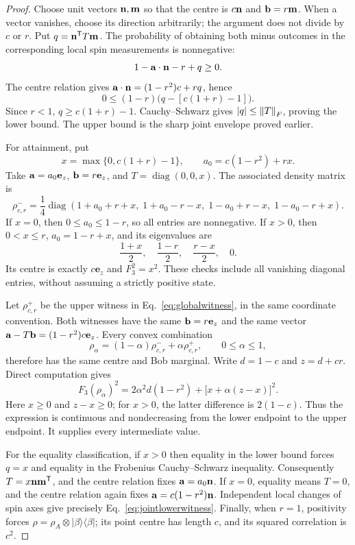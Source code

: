 \begin{proof}
Choose unit vectors $\nn,\mathbf m$ so that the centre is $c\nn$ and
$\bb=r\mathbf m$. When a vector vanishes, choose its direction arbitrarily;
the argument does not divide by $c$ or $r$. Put
$q=\nn^{\mathsf T}T\mathbf m$. The probability of obtaining both minus
outcomes in the corresponding local spin measurements is nonnegative:
\[
 1-\aa\cdot\nn-r+q\geq0.
\]
The centre relation gives
$\aa\cdot\nn=(1-r^2)c+rq$, hence
\begin{equation}\label{eq:lowerfactor}
0\leq(1-r)\bigl(q-[c(1+r)-1]\bigr).
\end{equation}
Since $r<1$, $q\geq c(1+r)-1$. Cauchy--Schwarz gives
$|q|\leq\norm T_F$, proving the lower bound. The upper bound is the sharp
joint envelope proved earlier.

For attainment, put
\[
x=\max\{0,c(1+r)-1\},\qquad a_0=c(1-r^2)+rx.
\]
Take $\aa=a_0\mathbf e_z$, $\bb=r\mathbf e_z$, and
$T=\operatorname{diag}(0,0,x)$. The associated density matrix is
\begin{equation}\label{eq:jointlowerwitness}
\rho^-_{c,r}=\frac14\operatorname{diag}
 (1+a_0+r+x,\;1+a_0-r-x,\;1-a_0+r-x,\;1-a_0-r+x).
\end{equation}
If $x=0$, then $0\leq a_0\leq1-r$, so all entries are nonnegative.
If $x>0$, then $0<x\leq r$, $a_0=1-r+x$, and its eigenvalues are
\[
\frac{1+x}{2},\quad\frac{1-r}{2},\quad\frac{r-x}{2},\quad0.
\]
Its centre is exactly $c\mathbf e_z$ and $F_3^2=x^2$.
These checks include all vanishing diagonal entries, without assuming a
strictly positive state.

Let $\rho^+_{c,r}$ be the upper witness in
Eq.~\eqref{eq:globalwitness}, in the same coordinate convention.
Both witnesses have the same $\bb=r\mathbf e_z$ and the same vector
$\aa-T\bb=(1-r^2)c\mathbf e_z$. Every convex combination
\[
\rho_\alpha=(1-\alpha)\rho^-_{c,r}+\alpha\rho^+_{c,r},
\qquad0\leq\alpha\leq1,
\]
therefore has the same centre and Bob marginal. Write $d=1-c$ and
$z=d+cr$. Direct computation gives
\begin{equation}\label{eq:jointinterpolate}
F_3(\rho_\alpha)^2=
2\alpha^2d(1-r^2)+\bigl[x+\alpha(z-x)\bigr]^2.
\end{equation}
Here $x\geq0$ and $z-x\geq0$; for $x>0$, the latter difference is
$2(1-c)$. Thus the expression is continuous and nondecreasing from the
lower endpoint to the upper endpoint. It supplies every intermediate value.

For the equality classification, if $x>0$ then equality in the lower bound
forces $q=x$ and equality in the Frobenius Cauchy--Schwarz inequality.
Consequently $T=x\nn\mathbf m^{\mathsf T}$, and the centre relation fixes
$\aa=a_0\nn$. If $x=0$, equality means $T=0$, and the centre relation again
fixes $\aa=c(1-r^2)\nn$. Independent local changes of spin axes give precisely
Eq.~\eqref{eq:jointlowerwitness}. Finally, when $r=1$, positivity forces
$\rho=\rho_A\otimes|\beta\rangle\langle\beta|$; its point centre has
length $c$, and its squared correlation is $c^2$.
\end{proof}

